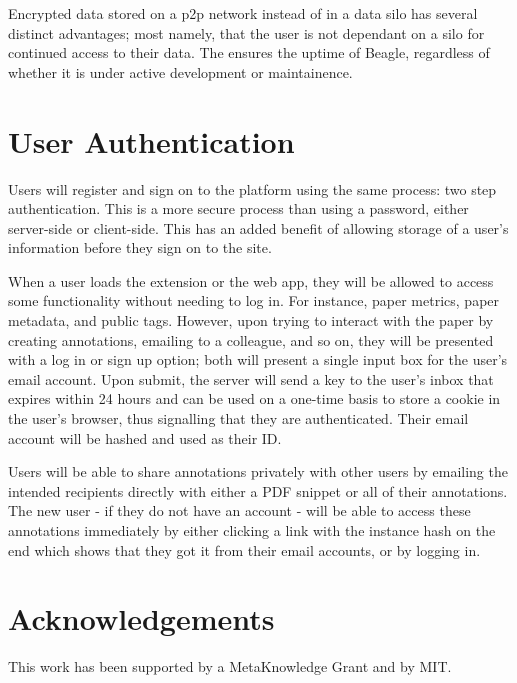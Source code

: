 \documentclass{sig-alternate}
\begin{document}

Encrypted data stored on a p2p network instead of in a data silo has several
distinct advantages; most namely, that the user is not dependant on a silo for
continued access to their data. The ensures the uptime of Beagle, regardless of
whether it is under active development or maintainence.

\section{User Authentication}

Users will register and sign on to the platform using the same process: two step authentication.
This is a more secure process than using a password, either server-side or client-side. %
This has an added benefit of allowing storage of a user's information before they
sign on to the site.

When a user loads the extension or the web app, they will be allowed to access some
functionality without needing to log in. For instance, paper metrics, paper
metadata, and public tags. However, upon trying to interact with the paper by creating
annotations, emailing to a colleague, and so on, they will be presented with a
log in or sign up option; both will present a single input box for the user's
email account. Upon submit, the server will send a key to the user's inbox that
expires within 24 hours and can be used on a one-time basis to store a cookie in
the user's browser, thus signalling that they are authenticated. Their email account
will be hashed and used as their ID.

Users will be able to share annotations privately with other users by emailing the
intended recipients directly with either a PDF snippet or all of their annotations.
The new user - if they do not have an account - will be able to access these
annotations immediately by either clicking a link with the instance hash on the end
which shows that they got it from their email accounts, or by logging in.


\section{Acknowledgements}

This work has been supported by a MetaKnowledge Grant and by MIT.

%
%
\end{document}
